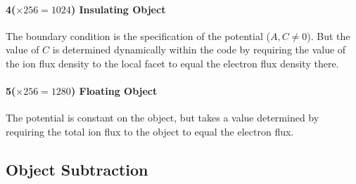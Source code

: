 \documentclass[12pt]{article}
\begin{document}
\paragraph{4($\times256=1024$) Insulating Object} The boundary
condition is the specification of the potential ($A,C\ne 0$). But the
value of $C$ is determined dynamically within the code by requiring
the value of the ion flux density to the local facet to equal the
electron flux density there.

\paragraph{5($\times256=1280$) Floating Object} The potential is constant
on the object, but takes a value determined by requiring the total ion
flux to the object to equal the electron flux.

\subsection{Object Subtraction}
\end{document}
